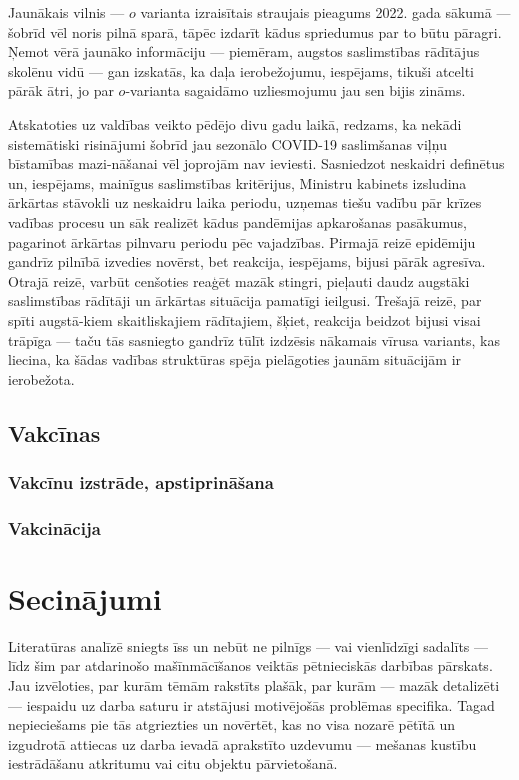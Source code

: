 \documentclass[12pt, a4paper]{article}
\numberwithin{equation}{section} %
\begin{document}
Jaunākais vilnis --- $o$ varianta izraisītais straujais pieagums 2022. gada sākumā --- šobrīd vēl noris pilnā sparā, tāpēc izdarīt kādus spriedumus par to būtu pāragri. Ņemot vērā jaunāko informāciju --- piemēram, augstos saslimstības rādītājus skolēnu vidū \cite{lv_sick_student} --- gan izskatās, ka daļa ierobežojumu, iespējams, tikuši atcelti pārāk ātri, jo par $o$-varianta sagaidāmo uzliesmojumu jau sen bijis zināms.

Atskatoties uz valdības veikto pēdējo divu gadu laikā, redzams, ka nekādi sistemātiski risinājumi šobrīd jau sezonālo COVID-19 saslimšanas viļņu bīstamības mazi-nāšanai vēl joprojām nav ieviesti. Sasniedzot neskaidri definētus un, iespējams, mainīgus saslimstības kritērijus, Ministru kabinets izsludina ārkārtas stāvokli uz neskaidru laika periodu, uzņemas tiešu vadību pār krīzes vadības procesu un sāk realizēt kādus pandēmijas apkarošanas pasākumus, pagarinot ārkārtas pilnvaru periodu pēc vajadzības. Pirmajā reizē epidēmiju gandrīz pilnībā izvedies novērst, bet reakcija, iespējams, bijusi pārāk agresīva. Otrajā reizē, varbūt cenšoties reaģēt mazāk stingri, pieļauti daudz augstāki saslimstības rādītāji un ārkārtas situācija pamatīgi ieilgusi. Trešajā reizē, par spīti augstā-kiem skaitliskajiem rādītajiem, šķiet, reakcija beidzot bijusi visai trāpīga --- taču tās sasniegto gandrīz tūlīt izdzēsis nākamais vīrusa variants, kas liecina, ka šādas vadības struktūras spēja pielāgoties jaunām situācijām ir ierobežota.

\subsection{Vakcīnas}

\subsubsection{Vakcīnu izstrāde, apstiprināšana}

\subsubsection{Vakcinācija}


\newpage
\section{Secinājumi}

Literatūras analīzē sniegts īss un nebūt ne pilnīgs --- vai vienlīdzīgi sadalīts --- līdz šim par atdarinošo mašīnmācīšanos veiktās pētnieciskās darbības pārskats. Jau izvēloties, par kurām tēmām rakstīts plašāk, par kurām --- mazāk detalizēti --- iespaidu uz darba saturu ir atstājusi motivējošās problēmas specifika. Tagad nepieciešams pie tās atgriezties un novērtēt, kas no visa nozarē pētītā un izgudrotā attiecas uz darba ievadā aprakstīto uzdevumu --- mešanas kustību iestrādāšanu atkritumu vai citu objektu pārvietošanā.
\end{document}
